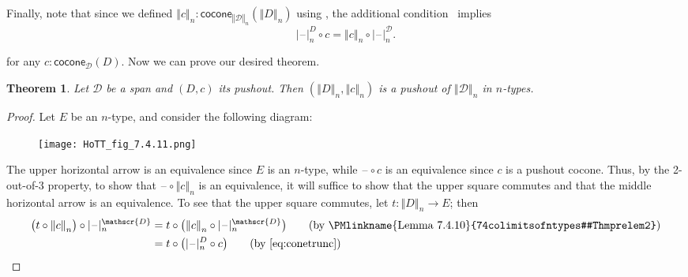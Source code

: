 \documentclass[12pt]{article}
\newcommand{\blank}{\mathord{\hspace{1pt}\text{--}\hspace{1pt}}}
\newcommand{\cocone}[2]{\mathsf{cocone}_{#1}(#2)}
\newcommand{\Ddiag}{\mathscr{D}}
\newcommand{\modal}{\ensuremath{\ocircle}}
\newcommand{\tprojf}[2][]{|\blank|_{#2}^{#1}}
\newcommand{\trunc}[2]{\mathopen{}\left\Vert #2\right\Vert_{#1}\mathclose{}}
\newcounter{mathcount}
\newenvironment{myeqn}{\begin{equation}}{\end{equation}\addtocounter{mathcount}{1}}
\newtheorem{prethm}{Theorem}
\newenvironment{thm}{\begin{prethm}}{\end{prethm}\addtocounter{mathcount}{1}}
\let\reflect\modal
\begin{document}
Finally, note that since we defined $\trunc nc : \cocone{\trunc n \Ddiag}{\trunc n D}$ using , the additional condition~ implies
\begin{myeqn}
  \tprojf[D] n \circ c = \trunc n c \circ \tprojf[\Ddiag]n. \label{eq:conetrunc}
\end{myeqn}
for any $c:\cocone{\Ddiag}{D}$.
Now we can prove our desired theorem.

\begin{thm}
  \label{reflectcommutespushout}
  Let $\Ddiag$ be a span and $(D,c)$ its pushout.
  Then $(\trunc nD,\trunc n c)$ is a pushout of $\trunc n\Ddiag$ in $n$-types.
\end{thm}
\begin{proof}
  Let $E$ be an $n$-type, and consider the following diagram:
\bgroup
\def\reflect(#1){\trunc n{#1}}
\begin{figure}
 \centering
 \texttt{[image: HoTT\_fig\_7.4.11.png]}
\end{figure}
\egroup
  The upper horizontal arrow is an equivalence since $E$ is an $n$-type, while $\blank\circ c$ is an equivalence since $c$ is a pushout cocone.
  Thus, by the 2-out-of-3 property, to show that $\blank\circ \trunc nc$ is an equivalence, it will suffice to show that the upper square commutes and that the middle horizontal arrow is an equivalence.
  To see that the upper square commutes, let $t:\trunc nD \to E$; then
  \begin{align}
    \big(t \circ \trunc n c\big) \circ \tprojf[\Ddiag] n
    &= t \circ \big(\trunc n c \circ \tprojf[\Ddiag] n\big)
    \tag{by \PMlinkname{Lemma 7.4.10}{74colimitsofntypes#Thmprelem2}}\\
    &= t\circ \big(\tprojf[D]n \circ c\big)
    \tag{by~\eqref{eq:conetrunc}}\\

\end{align}
\end{proof}
\end{document}
